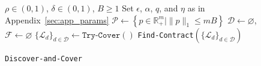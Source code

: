 \begin{figure}
	\vspace{-.5cm}
	\begin{minipage}{0.41\textwidth}
		\begin{algorithm}[H]
			\caption{\hspace{-0.4mm}\texttt{Discover-and-Cover}}\label{alg:final_algorithm}
			\small
			\begin{algorithmic}[1]
				\Require $\rho \in (0,1)$, $\delta \in (0,1)$, $B \geq 1$
				\State Set $\epsilon$, $\alpha$, $q$, and $\eta$ as in Appendix~\ref{sec:app_params}
				\State $\mathcal{P} \gets \left\{ p \in \mathbb{R}_+^m \mid  \| p \|_{1} \leq mB \right\}$\label{line:set_P}
				\State $\mathcal{D}\gets \varnothing$, $\mathcal{F} \gets \varnothing$ \label{line:set_D_F}
				\Do
				\State $ \{\mathcal{L}_{d}\}_{d\in  \mathcal{D} } \gets \texttt{Try-Cover}()$
				\State \Return \texttt{Find-Contract}$(\{\mathcal{L}_{d}\}_{d\in  \mathcal{D} } )$

\end{algorithmic}
\end{algorithm}
\end{minipage}
\end{figure}
